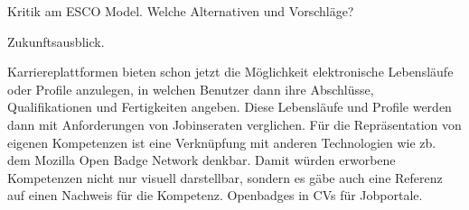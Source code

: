 Kritik 
  am ESCO Model. Welche Alternativen und Vorschläge?
  

Zukunftsausblick.

Karriereplattformen bieten schon jetzt die Möglichkeit elektronische Lebensläufe oder Profile anzulegen, in welchen Benutzer dann ihre Abschlüsse, Qualifikationen und Fertigkeiten angeben. Diese Lebensläufe und Profile werden dann mit Anforderungen von Jobinseraten verglichen. Für die Repräsentation von eigenen Kompetenzen ist eine Verknüpfung mit anderen Technologien wie zb. dem Mozilla Open Badge Network denkbar. Damit würden erworbene Kompetenzen nicht nur visuell darstellbar, sondern es gäbe auch eine Referenz auf einen Nachweis für die Kompetenz. 
Openbadges in CVs für Jobportale.

